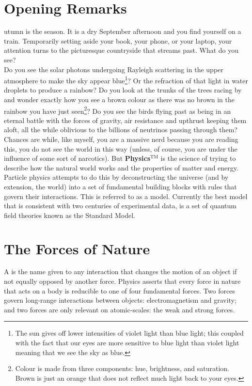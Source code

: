 \section{Opening Remarks}
utumn is the season. It is a dry September afternoon and you find yourself on a train. Temporarily setting aside your book, your phone, or your laptop, your attention turns to the picturesque countryside that streams past.  What do you see? \\

Do you see the solar photons undergoing Rayleigh scattering in the upper atmosphere to make the sky appear blue\footnote{The sun gives off lower intensities of violet light than blue light; this coupled with the fact that our eyes are more sensitive to blue light than violet light meaning that we see the sky as blue.}? Or the refraction of that light in water droplets to produce a rainbow? Do you look at the trunks of the trees racing by and wonder exactly how you see a brown colour as there was no brown in the rainbow you have just seen\footnote{Colour is made from three components: hue, brightness, and saturation. Brown is just an orange that does not reflect much light back to your eyes.}? Do you see the birds flying past as being in an eternal battle with the forces of gravity, air resistance and upthrust keeping them aloft, all the while oblivious to the billions of neutrinos passing through them? Chances are while, like myself, you are a massive nerd because you are reading this, you do not see the world in this way (unless, of course, you are under the influence of some sort of narcotics). But \textbf{Physics}$^{\text{TM}}$ is the science of trying to describe how the natural world works and the properties of matter and energy. Particle physics attempts to do this by deconstructing the universe (and by extension, the world) into a set of fundamental building blocks with rules that govern their interactions. This is referred to as a model. Currently the best model that is consistent with two centuries of experimental data, is a set of quantum field theories known as the Standard Model.

\section{The Forces of Nature}
A  is the name given to any interaction that changes the motion of an object if not equally opposed by another force. Physics asserts that every force in nature that acts on a body is reducible to one of four fundamental forces. Two forces govern long-range interactions between objects: electromagnetism and gravity; and two forces are only relevant on atomic-scales: the weak and strong forces.\\

